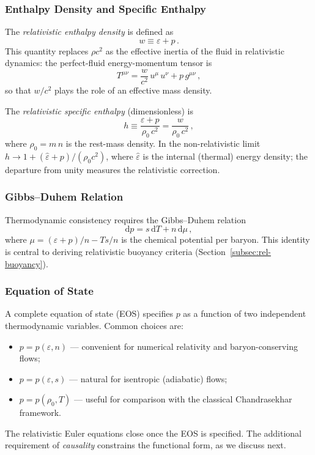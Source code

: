 \subsubsection{Enthalpy Density and Specific Enthalpy}
The \emph{relativistic enthalpy density} is defined as
\begin{equation}
  w \equiv \varepsilon + p \,.
  \label{eq:enthalpy-density}
\end{equation}
This quantity replaces $\rho c^{2}$ as the effective inertia of the
fluid in relativistic dynamics: the perfect-fluid energy-momentum
tensor is
\begin{equation}
  T^{\mu\nu} = \frac{w}{c^{2}}\,u^{\mu}\,u^{\nu} + p\,g^{\mu\nu}\,,
  \label{eq:perfect-Tmunu}
\end{equation}
so that $w/c^{2}$ plays the role of an effective mass density.

The \emph{relativistic specific enthalpy} (dimensionless) is
\begin{equation}
  h \equiv \frac{\varepsilon + p}{\rho_{0}\,c^{2}}
         = \frac{w}{\rho_{0}\,c^{2}}\,,
  \label{eq:specific-enthalpy}
\end{equation}
where $\rho_{0} = m\,n$ is the rest-mass density.  In the
non-relativistic limit $h \to 1 + (\hat\varepsilon + p)/(\rho_{0}c^{2})$,
where $\hat\varepsilon$ is the internal (thermal) energy density; the
departure from unity measures the relativistic correction.

\subsubsection{Gibbs--Duhem Relation}
Thermodynamic consistency requires the Gibbs--Duhem relation
\begin{equation}
  \mathrm{d} p = s\,\mathrm{d} T + n\,\mathrm{d}\mu \,,
  \label{eq:gibbs-duhem}
\end{equation}
where $\mu = (\varepsilon + p)/n - T s/n$ is the chemical potential per
baryon.  This identity is central to deriving relativistic buoyancy
criteria (Section~\ref{subsec:rel-buoyancy}).

\subsubsection{Equation of State}
A complete equation of state (EOS) specifies $p$ as a function of two
independent thermodynamic variables.  Common choices are:
\begin{itemize}
  \item $p = p(\varepsilon, n)$ — convenient for numerical relativity
        and baryon-conserving flows;
  \item $p = p(\varepsilon, s)$ — natural for isentropic (adiabatic) flows;
  \item $p = p(\rho_0, T)$ — useful for comparison with the classical
        Chandrasekhar framework.
\end{itemize}
The relativistic Euler equations close once the EOS is specified.  The
additional requirement of \emph{causality} constrains the functional
form, as we discuss next.


